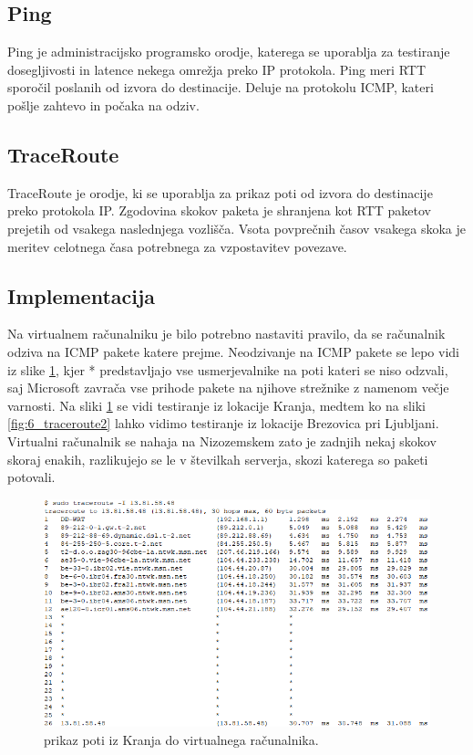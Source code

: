 \subsection{Ping}
Ping je administracijsko programsko orodje, katerega se uporablja za testiranje dosegljivosti in latence nekega omrežja preko IP protokola. Ping meri RTT sporočil poslanih od izvora do destinacije. Deluje na protokolu ICMP, kateri pošlje zahtevo in počaka na odziv.

\subsection{TraceRoute}
TraceRoute je orodje, ki se uporablja za prikaz poti od izvora do destinacije preko protokola IP. Zgodovina skokov paketa je shranjena kot RTT paketov prejetih od vsakega naslednjega vozlišča. Vsota povprečnih časov vsakega skoka je meritev celotnega časa potrebnega za vzpostavitev povezave.

\subsection{Implementacija}
Na virtualnem računalniku je bilo potrebno nastaviti pravilo, da se računalnik odziva na ICMP pakete katere prejme. Neodzivanje na ICMP pakete se lepo vidi iz slike \ref{fig:6_traceroute1}, kjer * predstavljajo vse usmerjevalnike na poti kateri se niso odzvali, saj Microsoft zavrača vse prihode pakete na njihove strežnike z namenom večje varnosti. Na sliki \ref{fig:6_traceroute1} se vidi testiranje iz lokacije Kranja, medtem ko na sliki \ref{fig:6_traceroute2} lahko vidimo testiranje iz lokacije Brezovica pri Ljubljani. Virtualni računalnik se nahaja na Nizozemskem zato je zadnjih nekaj skokov skoraj enakih, razlikujejo se le v številkah serverja, skozi katerega so paketi potovali.

\begin{figure}[H]
    \centering
    \includegraphics[scale=0.45]{Img/traceroute1.png}
    \caption{prikaz poti iz Kranja do virtualnega računalnika.}
    \label{fig:6_traceroute1}
\end{figure}

